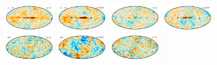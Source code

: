 \documentclass[twocolumn]{../../common/aa}
\begin{document}
\begin{figure}
	\centering
	\includegraphics[width=0.24\textwidth]{figures/KKa_deltaQ.pdf}
	\includegraphics[width=0.24\textwidth]{figures/KKa_W_deltaQ.pdf}
	\includegraphics[width=0.24\textwidth]{figures/KKa_deltaU.pdf}
	\includegraphics[width=0.24\textwidth]{figures/KKa_W_deltaU.pdf}\\
	\includegraphics[width=0.24\textwidth]{figures/Q_deltaQ.pdf}
	\includegraphics[width=0.24\textwidth]{figures/Q_W_deltaQ.pdf}
	\includegraphics[width=0.24\textwidth]{figures/Q_deltaU.pdf}

\end{figure}
\end{document}
